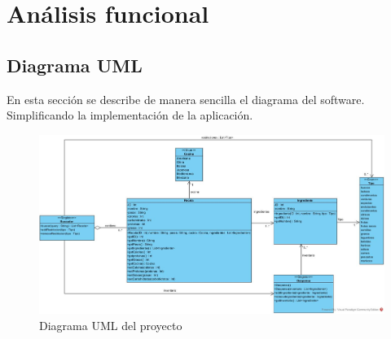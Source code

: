 \section{Análisis funcional}
\subsection{Diagrama UML}
En esta sección se describe de manera sencilla el diagrama del software. Simplificando la implementación de la aplicación.

\begin{figure}[h!]
\centering
\includegraphics[width=125mm,scale=1]{imagenes/Class Diagram1.jpg}
\caption{Diagrama UML del proyecto}
\label{fig:UML}
\end{figure}


